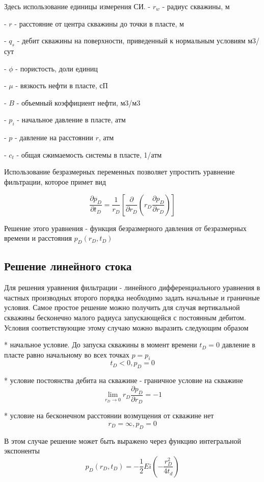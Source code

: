 \documentclass[oneside, openany]{memoir}
\begin{document}
	Здесь использование единицы измерения СИ.
	- $r_w$ - радиус скважины, м
	
	- $r$ - расстояние от центра скважины до точки в пласте, м
	
	- $q_s$ - дебит скважины на поверхности, приведенный к нормальным условиям м3/сут
	
	- $\phi$ - пористость, доли единиц
	
	- $\mu$ - вязкость нефти в пласте, сП
	
	- $B$ - объемный коэффициент нефти, м3/м3
	
	- $p_i$ - начальное давление в пласте, атм
	
	- $p$ - давление на расстоянии $r$, атм
	
	- $c_t$ - общая сжимаемость системы в пласте, 1/атм
	
	Использование безразмерных переменных позволяет упростить уравнение фильтрации, которое примет вид
	
	$$ 
	\frac{\partial p_D}{ \partial t_D} = \dfrac{1}{r_D} \left[ \dfrac{\partial}{\partial r_D} \left( r_D \dfrac{ \partial p_D} {\partial r_D} \right) \right] 
	$$
	
	Решение этого уравнения - функция безразмерного давления от безразмерных времени и расстояния $p_D(r_D, t_D) $
	
	\subsection{Решение линейного стока} 
	
	Для решения уравнения фильтрации - линейного дифференциального уравнения в частных производных второго порядка необходимо задать начальные и граничные условия.
	Самое простое решение можно получить для случая вертикальной скважины бесконечно малого радиуса запускающейся с постоянным дебитом. Условия соответствующие этому случаю можно выразить следующим образом
	
	* начальное условие. До запуска скважины в момент времени  $t_D = 0$ давление в пласте равно начальному во всех точках $p=p_i$
	$$ t_D < 0, p_D = 0$$
	
	* условие постоянства дебита на скважине - граничное условие на скважине
	$$ \lim_{r_D \to 0} {r_D \frac{\partial p_D}{\partial r_D}} = -1 $$
	
	* условие на бесконечном расстоянии возмущения от скважине нет
	$$ r_D = \infty, p_D = 0 $$
	
	В этом случае решение может быть выражено через функцию интегральной экспоненты
	$$ p_D(r_D,t_D) = - \frac{1}{2} Ei \left(- \dfrac{ r_D^2}{4t_d} \right) $$
	
\end{document}
